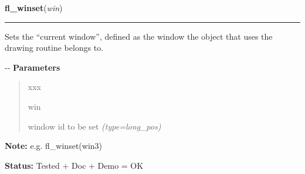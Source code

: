 \hspace{.8\funcindent}\begin{boxedminipage}{\funcwidth}

    \raggedright \textbf{fl\_winset}(\textit{win})

    \vspace{-1.5ex}

    \rule{\textwidth}{0.5\fboxrule}
\setlength{\parskip}{2ex}

Sets the ``current window'', defined as the window the object that uses
the drawing routine belongs to.

-{}-
\setlength{\parskip}{1ex}
      \textbf{Parameters}
      \vspace{-1ex}

      \begin{quote}
        \begin{Ventry}{xxx}

          \item[win]


window id to be set
            {\it (type=long\_pos)}

        \end{Ventry}

      \end{quote}

\textbf{Note:} 
e.g. fl\_winset(win3)


\textbf{Status:} 
Tested + Doc + Demo = OK


    \end{boxedminipage}

    \label{xformslib:flxbasic:fl_winreparent}

    \vspace{0.5ex}

